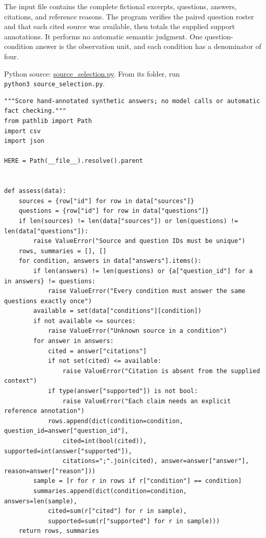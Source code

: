 \noindent \noindent The input file contains the complete fictional excerpts,
questions, answers, citations, and reference reasons. The program
verifies the paired question roster and that each cited source was
available, then totals the supplied support annotations. It performs no
automatic semantic judgment. One question-condition answer is the
observation unit, and each condition has a denominator of four.

\FloatBarrier
{}
Python source:
\href{../03_Data_and_Code/AI_Evidence_and_Evaluation/source_selection.py}{source\_selection.py}.
From its folder, run \texttt{python3\ source\_selection.py}.

\begin{Verbatim}[breaklines,breakanywhere,fontsize=\small]
"""Score hand-annotated synthetic answers; no model calls or automatic fact checking."""
from pathlib import Path
import csv
import json

HERE = Path(__file__).resolve().parent


def assess(data):
    sources = {row["id"] for row in data["sources"]}
    questions = {row["id"] for row in data["questions"]}
    if len(sources) != len(data["sources"]) or len(questions) != len(data["questions"]):
        raise ValueError("Source and question IDs must be unique")
    rows, summaries = [], []
    for condition, answers in data["answers"].items():
        if len(answers) != len(questions) or {a["question_id"] for a in answers} != questions:
            raise ValueError("Every condition must answer the same questions exactly once")
        available = set(data["conditions"][condition])
        if not available <= sources:
            raise ValueError("Unknown source in a condition")
        for answer in answers:
            cited = answer["citations"]
            if not set(cited) <= available:
                raise ValueError("Citation is absent from the supplied context")
            if type(answer["supported"]) is not bool:
                raise ValueError("Each claim needs an explicit reference annotation")
            rows.append(dict(condition=condition, question_id=answer["question_id"],
                cited=int(bool(cited)), supported=int(answer["supported"]),
                citations=";".join(cited), answer=answer["answer"], reason=answer["reason"]))
        sample = [r for r in rows if r["condition"] == condition]
        summaries.append(dict(condition=condition, answers=len(sample),
            cited=sum(r["cited"] for r in sample),
            supported=sum(r["supported"] for r in sample)))
    return rows, summaries



\end{Verbatim}
